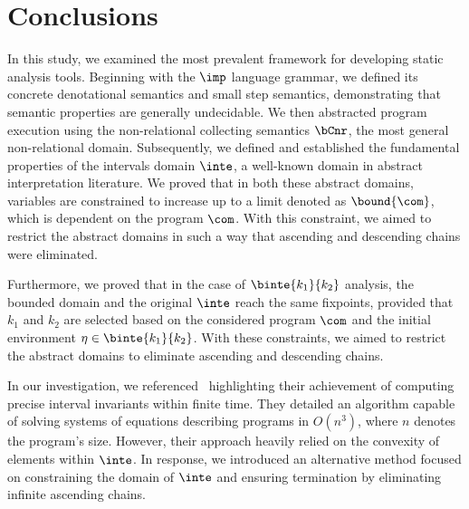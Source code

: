 \chapter{Conclusions}\label{ch:conclusion}

In this study, we examined the most prevalent framework for developing
static analysis tools. Beginning with the \(\imp\) language grammar,
we defined its concrete denotational semantics and small step
semantics, demonstrating that semantic properties are generally
undecidable. We then abstracted program execution using the
non-relational collecting semantics \(\bCnr\), the most general
non-relational domain. Subsequently, we defined and established the
fundamental properties of the intervals domain \(\inte\), a well-known
domain in abstract interpretation literature. We proved that in both
these abstract domains, variables are constrained to increase up to a
limit denoted as \(\bound{\com}\), which is dependent on the program
\(\com\). With this constraint, we aimed to restrict the abstract
domains in such a way that ascending and descending chains were
eliminated.

Furthermore, we proved that in the case of \(\binte{k_1}{k_2}\)
analysis, the bounded domain and the original \(\inte\) reach the same
fixpoints, provided that \(k_1\) and \(k_2\) are selected based on the
considered program \(\com\) and the initial environment
\(\eta \in \binte{k_1}{k_2}\). With these constraints, we aimed to
restrict the abstract domains to eliminate ascending and descending
chains.

In our investigation, we referenced~\cite{Gawlitza2009}
highlighting their achievement of computing precise interval
invariants within finite time. They detailed an algorithm capable of
solving systems of equations describing programs in \(O(n^3)\), where
\(n\) denotes the program's size. However, their approach heavily
relied on the convexity of elements within \(\inte\). In response, we
introduced an alternative method focused on constraining the domain of
\(\inte\) and ensuring termination by eliminating infinite ascending
chains.

